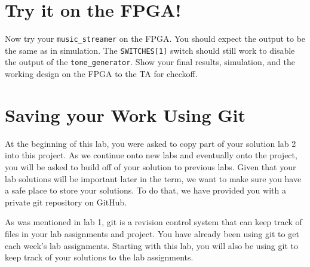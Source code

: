 \documentclass[11pt]{article}
\begin{document}
\section{Try it on the FPGA!}
Now try your \verb|music_streamer| on the FPGA. You should expect the output to be the same as in simulation. The \verb|SWITCHES[1]| switch should still work to disable the output of the \verb|tone_generator|. Show your final results, simulation, and the working design on the FPGA to the TA for checkoff.




\section{Saving your Work Using Git}
At the beginning of this lab, you were asked to copy part of your solution lab 2 into this project.  As we continue onto new labs and eventually onto the project, you will be asked to build off of your solution to previous labs.  Given that your lab solutions will be important later in the term, we want to make sure you have a safe place to store your solutions.  To do that, we have provided you with a private git repository on GitHub.

As was mentioned in lab 1, git is a revision control system that can keep track of files in your lab assignments and project.  You have already been using git to get each week's lab assignments.  Starting with this lab, you will also be using git to keep track of your solutions to the lab assignments.
\end{document}
